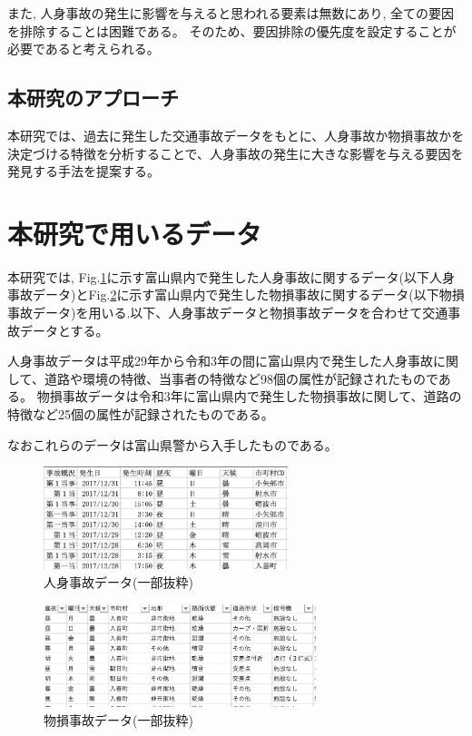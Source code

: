 \documentclass[a4j,8.5pt, twocolumn,fleqn]{jbook}
\begin{document}
また, 人身事故の発生に影響を与えると思われる要素は無数にあり, 全ての要因を排除することは困難である。
そのため、要因排除の優先度を設定することが必要であると考えられる。

\subsection{本研究のアプローチ}
本研究では、過去に発生した交通事故データをもとに、人身事故か物損事故かを決定づける特徴を分析することで、人身事故の発生に大きな影響を与える要因を発見する手法を提案する。



\section{本研究で用いるデータ}
本研究では, Fig.\ref{人身事故データ}に示す富山県内で発生した人身事故に関するデータ(以下人身事故データ)とFig.\ref{物損事故データ}に示す富山県内で発生した物損事故に関するデータ(以下物損事故データ)を用いる.以下、人身事故データと物損事故データを合わせて交通事故データとする。

人身事故データは平成29年から令和3年の間に富山県内で発生した人身事故に関して、道路や環境の特徴、当事者の特徴など98個の属性が記録されたものである。
物損事故データは令和3年に富山県内で発生した物損事故に関して、道路の特徴など25個の属性が記録されたものである。

なおこれらのデータは富山県警から入手したものである。

\begin{figure}[htb]
    \centering
    \includegraphics[height=30mm]{images/jinshixn.eps}
    \caption{人身事故データ(一部抜粋)}
    \label{人身事故データ}
\end{figure}

\begin{figure}[htb]
    \centering
    \includegraphics[height=30mm]{images/bussoxn.eps}
    \vspace{-3mm}
    \caption{物損事故データ(一部抜粋)}
    \label{物損事故データ}
\end{figure}
\end{document}
